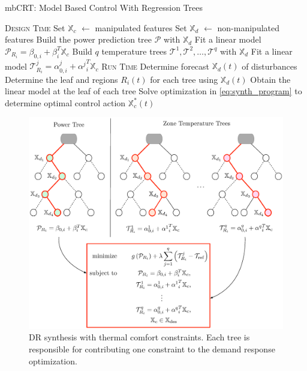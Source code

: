 \begin{algorithm}[t]
\caption{mbCRT: Model Based Control With Regression Trees}\label{alg:mbcrt}
\begin{algorithmic}[]
\State \textsc{Design Time}
\State Set $\mathbb{X}_c$ $\gets$ manipulated features
\State Set $\mathbb{X}_d$ $\gets$ non-manipulated features
\State Build the power prediction tree $\mathcal{P}$ with $\mathbb{X}_d$
\State Fit a linear model $\mathcal{P}_{R_i} = \beta_{0,i} + \beta^T_i \mathbb{X}_c$
\EndFor
\State Build $q$ temperature trees $\mathcal{T}^1,\mathcal{T}^2, \dots, \mathcal{T}^q$ with $\mathbb{X}_d$
\State Fit a linear model $\mathcal{T}_{R_i}^j = \alpha_{0,i}^j + {\alpha^j}^T_i \mathbb{X}_c$
\EndFor
\EndProcedure
\State \textsc{Run Time}
\State Determine forecast $\mathbb{X}_d(t)$ of disturbances
\State Determine the leaf and regions $R_{i}(t)$ for each tree using $\mathbb{X}_d(t)$
\State Obtain the linear model at the leaf of each tree
\State Solve optimization in \eqref{eq:synth_program} to determine optimal control action $\mathbb{X}^*_c(t)$
\EndWhile
\EndProcedure
\end{algorithmic}
\end{algorithm}

\begin{figure}[h]
\centering
\includegraphics[width=0.95\columnwidth]{Figures/mbCRT.eps}
\caption{DR synthesis with thermal comfort constraints. Each tree is responsible for contributing one constraint to the demand response optimization.}
\label{fig:dropt}
\end{figure}

